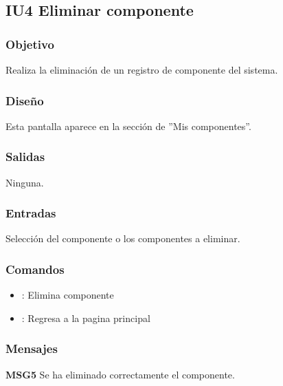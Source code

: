 \subsection{IU4 Eliminar componente}

\subsubsection{Objetivo}
	Realiza la eliminación de un registro de componente del sistema.

\subsubsection{Diseño}
	Esta pantalla aparece en la secci\'on de ''Mis componentes''. 


\subsubsection{Salidas}

	Ninguna.

\subsubsection{Entradas}
Selecci\'on del componente o los componentes a eliminar.

\subsubsection{Comandos}
\begin{itemize}
	\item {}: Elimina componente
	
	\item {}: Regresa a la pagina principal

\end{itemize}

\subsubsection{Mensajes}
	\begin{Citemize}
		\item {\bf MSG5} Se ha eliminado correctamente el componente.
	\end{Citemize}